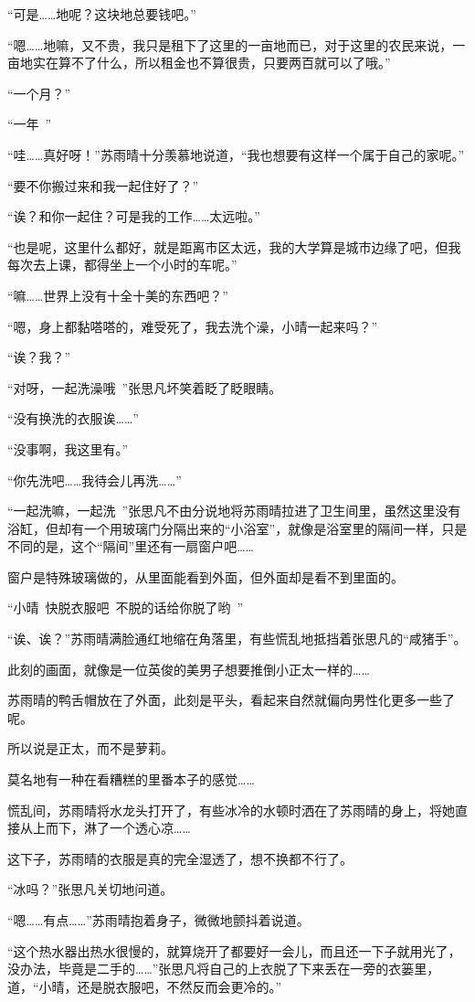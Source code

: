 “可是……地呢？这块地总要钱吧。”

“嗯……地嘛，又不贵，我只是租下了这里的一亩地而已，对于这里的农民来说，一亩地实在算不了什么，所以租金也不算很贵，只要两百就可以了哦。”

“一个月？”

“一年~”

“哇……真好呀！”苏雨晴十分羡慕地说道，“我也想要有这样一个属于自己的家呢。”

“要不你搬过来和我一起住好了？”

“诶？和你一起住？可是我的工作……太远啦。”

“也是呢，这里什么都好，就是距离市区太远，我的大学算是城市边缘了吧，但我每次去上课，都得坐上一个小时的车呢。”

“嘛……世界上没有十全十美的东西吧？”

“嗯，身上都黏嗒嗒的，难受死了，我去洗个澡，小晴一起来吗？”

“诶？我？”

“对呀，一起洗澡哦~”张思凡坏笑着眨了眨眼睛。

“没有换洗的衣服诶……”

“没事啊，我这里有。”

“你先洗吧……我待会儿再洗……”

“一起洗嘛，一起洗~”张思凡不由分说地将苏雨晴拉进了卫生间里，虽然这里没有浴缸，但却有一个用玻璃门分隔出来的“小浴室”，就像是浴室里的隔间一样，只是不同的是，这个“隔间”里还有一扇窗户吧……

窗户是特殊玻璃做的，从里面能看到外面，但外面却是看不到里面的。

“小晴~快脱衣服吧~不脱的话给你脱了哟~”

“诶、诶？”苏雨晴满脸通红地缩在角落里，有些慌乱地抵挡着张思凡的“咸猪手”。

此刻的画面，就像是一位英俊的美男子想要推倒小正太一样的……

苏雨晴的鸭舌帽放在了外面，此刻是平头，看起来自然就偏向男性化更多一些了呢。

所以说是正太，而不是萝莉。

莫名地有一种在看糟糕的里番本子的感觉……

慌乱间，苏雨晴将水龙头打开了，有些冰冷的水顿时洒在了苏雨晴的身上，将她直接从上而下，淋了一个透心凉……

这下子，苏雨晴的衣服是真的完全湿透了，想不换都不行了。

“冰吗？”张思凡关切地问道。

“嗯……有点……”苏雨晴抱着身子，微微地颤抖着说道。

“这个热水器出热水很慢的，就算烧开了都要好一会儿，而且还一下子就用光了，没办法，毕竟是二手的……”张思凡将自己的上衣脱了下来丢在一旁的衣篓里，道，“小晴，还是脱衣服吧，不然反而会更冷的。”

